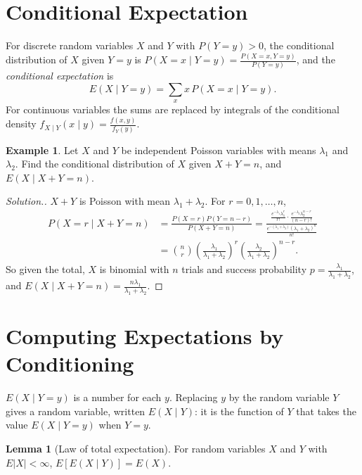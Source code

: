 \documentclass[12pt,a4paper]{report}
\theoremstyle{definition}
\newtheorem{exa}[thm]{Example}
\newtheorem{lem}[thm]{Lemma}
\newenvironment{solution}
  {\renewcommand{\qedsymbol}{}\begin{proof}[\textit{Solution}.]}
  {\end{proof}}
\begin{document}
\section{Conditional Expectation}

For discrete random variables $X$ and $Y$ with $P(Y = y)>0$, the conditional distribution
of $X$ given $Y = y$ is $P(X = x\mid Y = y) = \frac{P(X = x, Y = y)}{P(Y = y)}$, and the
\emph{conditional expectation} is
\[E(X\mid Y = y) = \sum_x x\,P(X = x\mid Y = y) .\]
For continuous variables the sums are replaced by integrals of the conditional density
$f_{X\mid Y}(x\mid y) = \frac{f(x, y)}{f_Y(y)}$.

\begin{exa}
\label{ex:poissonsplit}
Let $X$ and $Y$ be independent Poisson variables with means $\lambda_1$ and $\lambda_2$.
Find the conditional distribution of $X$ given $X + Y = n$, and $E(X\mid X + Y = n)$.
\end{exa}

\begin{solution}
$X + Y$ is Poisson with mean $\lambda_1 + \lambda_2$. For $r = 0, 1, \dots, n$,
\begin{align*}
P(X = r\mid X + Y = n) &= \frac{P(X = r)P(Y = n - r)}{P(X + Y = n)}
= \frac{\frac{e^{-\lambda_1}\lambda_1^r}{r!}\cdot\frac{e^{-\lambda_2}\lambda_2^{n - r}}{(n - r)!}}{\frac{e^{-(\lambda_1 + \lambda_2)}(\lambda_1 + \lambda_2)^n}{n!}}\\
&= \binom nr\left(\frac{\lambda_1}{\lambda_1 + \lambda_2}\right)^r\left(\frac{\lambda_2}{\lambda_1 + \lambda_2}\right)^{n - r} .
\end{align*}
So given the total, $X$ is binomial with $n$ trials and success probability
$p = \frac{\lambda_1}{\lambda_1 + \lambda_2}$, and $E(X\mid X + Y = n) = \frac{n\lambda_1}{\lambda_1 + \lambda_2}$.
\end{solution}

\section{Computing Expectations by Conditioning}

$E(X\mid Y = y)$ is a number for each $y$. Replacing $y$ by the random variable $Y$ gives
a random variable, written $E(X\mid Y)$: it is the function of $Y$ that takes the value
$E(X\mid Y = y)$ when $Y = y$.

\begin{lem}[Law of total expectation]
\label{lem:totalexpectation}
For random variables $X$ and $Y$ with $E|X|<\infty$, $E\left[E(X\mid Y)\right] = E(X)$.
\end{lem}
\end{document}
